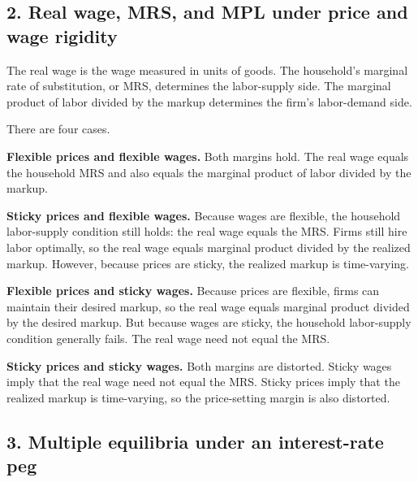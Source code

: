 \documentclass[12pt]{article}
\begin{document}
\newpage
\subsection*{2. Real wage, MRS, and MPL under price and wage rigidity}

The real wage is the wage measured in units of goods. The household's marginal rate of substitution, or MRS, determines the labor-supply side. The marginal product of labor divided by the markup determines the firm's labor-demand side.

There are four cases.

\textbf{Flexible prices and flexible wages.}  
Both margins hold. The real wage equals the household MRS and also equals the marginal product of labor divided by the markup.

\textbf{Sticky prices and flexible wages.}  
Because wages are flexible, the household labor-supply condition still holds: the real wage equals the MRS. Firms still hire labor optimally, so the real wage equals marginal product divided by the realized markup. However, because prices are sticky, the realized markup is time-varying.

\textbf{Flexible prices and sticky wages.}  
Because prices are flexible, firms can maintain their desired markup, so the real wage equals marginal product divided by the desired markup. But because wages are sticky, the household labor-supply condition generally fails. The real wage need not equal the MRS.

\textbf{Sticky prices and sticky wages.}  
Both margins are distorted. Sticky wages imply that the real wage need not equal the MRS. Sticky prices imply that the realized markup is time-varying, so the price-setting margin is also distorted.












\newpage
\subsection*{3. Multiple equilibria under an interest-rate peg}
\end{document}
